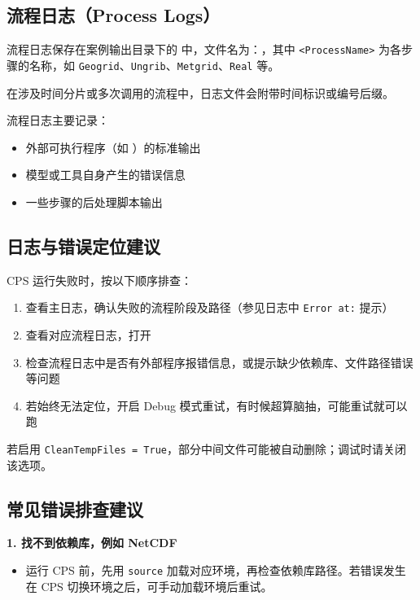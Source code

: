 \documentclass[UTF8,a4paper,11pt,fontset=none]{ctexart}
\begin{document}
\subsection{流程日志（Process Logs）}

流程日志保存在案例输出目录下的  中，文件名为：，其中 \texttt{<ProcessName>} 为各步骤的名称，如 \texttt{Geogrid}、\texttt{Ungrib}、\texttt{Metgrid}、\texttt{Real} 等。


在涉及时间分片或多次调用的流程中，日志文件会附带时间标识或编号后缀。

流程日志主要记录：

\begin{itemize}[leftmargin=4em]
    \item 外部可执行程序（如 ）的标准输出
    \item 模型或工具自身产生的错误信息
    \item 一些步骤的后处理脚本输出
\end{itemize}

\subsection{日志与错误定位建议}

CPS 运行失败时，按以下顺序排查：

\begin{enumerate}
    \item 查看主日志，确认失败的流程阶段及路径（参见日志中 \texttt{Error at:} 提示）
    \item 查看对应流程日志，打开 
    \item 检查流程日志中是否有外部程序报错信息，或提示缺少依赖库、文件路径错误等问题
    \item 若始终无法定位，开启 Debug 模式重试，有时候超算脑抽，可能重试就可以跑
\end{enumerate}
\begin{CPSNote}[Tips]
    若启用 \texttt{CleanTempFiles = True}，部分中间文件可能被自动删除；调试时请关闭该选项。
\end{CPSNote}


\subsection{常见错误排查建议}

\textbf{1. 找不到依赖库，例如 NetCDF}

\begin{itemize}[leftmargin=4em]
    \item 运行 CPS 前，先用 \texttt{source} 加载对应环境，再检查依赖库路径。若错误发生在 CPS 切换环境之后，可手动加载环境后重试。
\end{itemize}
\end{document}
